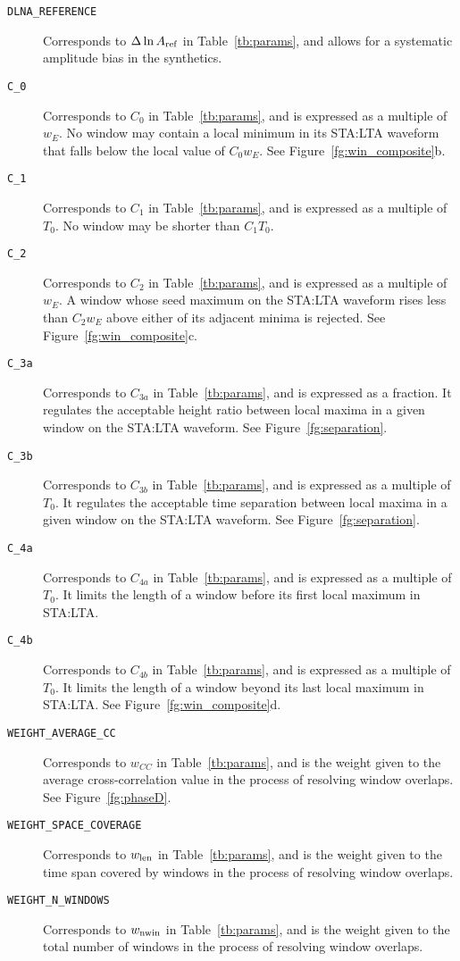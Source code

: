 \begin{description}
\item[{\tt DLNA\_REFERENCE}]Corresponds to $\Delta\ln{A}_{\rm ref}$ in Table~\ref{tb:params}, and allows for a systematic amplitude bias in the synthetics.
\item[{\tt C\_0}]Corresponds to $C_0$ in Table~\ref{tb:params}, and is expressed as a multiple of $w_E$.  No window may contain a local minimum in its STA:LTA waveform that falls below the local value of $C_0 w_E$.  See Figure~\ref{fg:win_composite}b.
\item[{\tt C\_1}]Corresponds to $C_1$ in Table~\ref{tb:params}, and is expressed as a multiple of $T_0$.  No window may be shorter than $C_1 T_0$.
\item[{\tt C\_2}]Corresponds to $C_2$ in Table~\ref{tb:params}, and is expressed as a multiple of $w_E$.  A window whose seed maximum on the STA:LTA waveform rises less than $C_2 w_E$ above either of its adjacent minima is rejected.  See Figure~\ref{fg:win_composite}c.
\item[{\tt C\_{3a}}]Corresponds to $C_{3a}$ in Table~\ref{tb:params}, and is expressed as a fraction.  It regulates the acceptable height ratio between local maxima in a given window on the STA:LTA waveform.  See Figure~\ref{fg:separation}.
\item[{\tt C\_{3b}}]Corresponds to $C_{3b}$ in Table~\ref{tb:params}, and is expressed as a multiple of $T_0$.  It regulates the acceptable time separation between local maxima in a given window on the STA:LTA waveform.  See Figure~\ref{fg:separation}.
\item[{\tt C\_{4a}}]Corresponds to $C_{4a}$ in Table~\ref{tb:params}, and is expressed as a multiple of $T_0$.  It limits the length of a window before its first local maximum in STA:LTA. 
\item[{\tt C\_{4b}}]Corresponds to $C_{4b}$ in Table~\ref{tb:params}, and is expressed as a multiple of $T_0$.  It limits the length of a window beyond its last local maximum in STA:LTA.  See Figure~\ref{fg:win_composite}d.
\item[{\tt WEIGHT\_AVERAGE\_CC}]Corresponds to $w_{CC}$ in Table~\ref{tb:params}, and is the weight given to the average cross-correlation value in the process of resolving window overlaps. See Figure~\ref{fg:phaseD}.
\item[{\tt WEIGHT\_SPACE\_COVERAGE}]Corresponds to $w_{\rm len}$ in Table~\ref{tb:params}, and is the weight given to the time span covered by windows in the process of resolving window overlaps. 
\item[{\tt WEIGHT\_N\_WINDOWS}]Corresponds to $w_{\rm nwin}$ in Table~\ref{tb:params}, and is the weight given to the total number of windows in the process of resolving window overlaps. 
\end{description}

